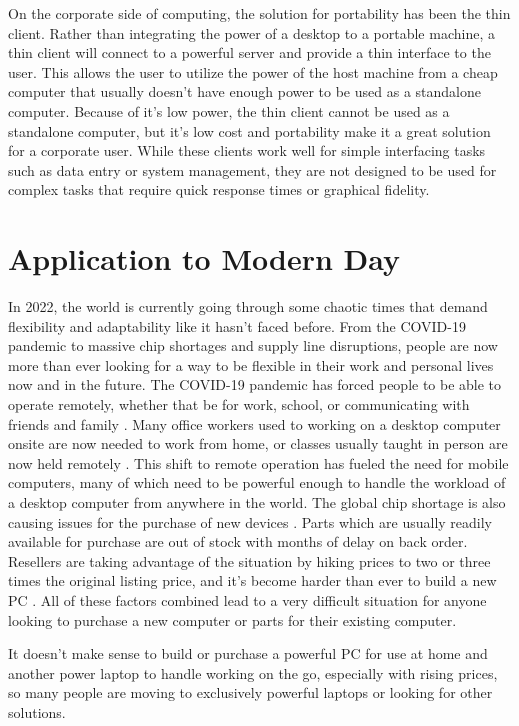 On the corporate side of computing, the solution for portability has been the thin client.
Rather than integrating the power of a desktop to a portable machine, a thin client will connect to a powerful server and provide a thin interface to the user.
This allows the user to utilize the power of the host machine from a cheap computer that usually doesn't have enough power to be used as a standalone computer.
Because of it's low power, the thin client cannot be used as a standalone computer, but it's low cost and portability make it a great solution for a corporate user.
While these clients work well for simple interfacing tasks such as data entry or system management, they are not designed to be used for complex tasks that require quick response times or graphical fidelity.


\section{Application to Modern Day}\label{sec:ApplicationToModernDay}

In 2022, the world is currently going through some chaotic times that demand flexibility and adaptability like it hasn't faced before.
From the COVID-19 pandemic to massive chip shortages and supply line disruptions, people are now more than ever looking for a way to be flexible in their work and personal lives now and in the future.
The COVID-19 pandemic has forced people to be able to operate remotely, whether that be for work, school, or communicating with friends and family \cite{levanon_2020}.
Many office workers used to working on a desktop computer onsite are now needed to work from home, or classes usually taught in person are now held remotely \cite{ASU_covid_19}.
This shift to remote operation has fueled the need for mobile computers, many of which need to be powerful enough to handle the workload of a desktop computer from anywhere in the world.
The global chip shortage is also causing issues for the purchase of new devices \cite{chipshortage_jpmorgan}.
Parts which are usually readily available for purchase are out of stock with months of delay on back order.
Resellers are taking advantage of the situation by hiking prices to two or three times the original listing price, and it's become harder than ever to build a new PC \cite{tamarov_2021}.
All of these factors combined lead to a very difficult situation for anyone looking to purchase a new computer or parts for their existing computer.

It doesn't make sense to build or purchase a powerful PC for use at home and another power laptop to handle working on the go, especially with rising prices, so many people are moving to exclusively powerful laptops or looking for other solutions.
